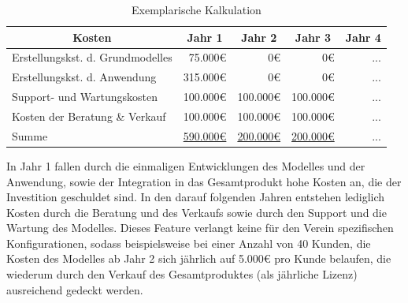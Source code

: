 \begin{table}[H]
\centering
\caption{Exemplarische Kalkulation}
\label{calc}
\begin{tabular}{|l|r|r|r|r|}
\hline
\multicolumn{1}{|c|}{\textbf{Kosten}} & \multicolumn{1}{c|}{\textbf{Jahr 1}} & \multicolumn{1}{c|}{\textbf{Jahr 2}} & \multicolumn{1}{c|}{\textbf{Jahr 3}} & \multicolumn{1}{c|}{\textbf{Jahr 4}} \\ \hline
Erstellungskst. d. Grundmodelles      & 75.000\euro                              & 0\euro                                   & 0\euro                                   & ...                                  \\ \hline
Erstellungskst. d. Anwendung          & 315.000\euro                             & 0\euro                                   & 0\euro                                   & ...                                   \\ \hline
Support- und Wartungskosten           & 100.000\euro                             & 100.000\euro                             & 100.000\euro                             & ...                                  \\ \hline
Kosten der Beratung \& Verkauf        & 100.000\euro                             & 100.000\euro                             & 100.000\euro                             & ...                                  \\ \hline
Summe                                 & \underline{590.000\euro}                             & \underline{200.000\euro} & \underline{200.000\euro}                            & ...                                  \\ \hline
\end{tabular}
\end{table}

In Jahr 1 fallen durch die einmaligen Entwicklungen des Modelles und der Anwendung, sowie der Integration in das Gesamtprodukt hohe Kosten an, die der Investition geschuldet sind. In den darauf folgenden Jahren entstehen lediglich Kosten durch die Beratung und des Verkaufs sowie durch den Support und die Wartung des Modelles. Dieses Feature verlangt keine für den Verein spezifischen Konfigurationen, sodass beispielsweise bei einer Anzahl von 40 Kunden, die Kosten des Modelles ab Jahr 2 sich jährlich auf \textsf{5.000\euro} pro Kunde belaufen, die wiederum durch den Verkauf des Gesamtproduktes (als jährliche Lizenz) ausreichend gedeckt werden. 


